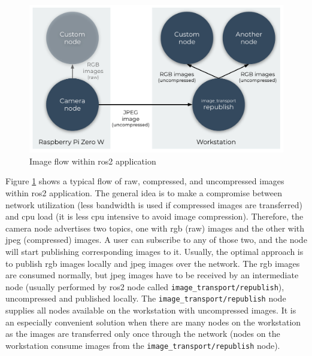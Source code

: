 \begin{figure}[H]
    \centering
    \includegraphics[width=1\textwidth]{physical/figures/camera_ros_images.pdf}
    \caption{Image flow within \ac{ros2} application}
    \label{fig:physical:camera_ros_images}
\end{figure}

Figure \ref{fig:physical:camera_ros_images} shows a typical flow of raw, compressed, and uncompressed images within \ac{ros2} application.
The general idea is to make a compromise between network utilization (less bandwidth is used if compressed images are transferred) and \ac{cpu} load (it is less \ac{cpu} intensive to avoid image compression).
Therefore, the camera node advertises two topics, one with \acs{rgb} (raw) images and the other with \acs{jpeg} (compressed) images.
A user can subscribe to any of those two, and the node will start publishing corresponding images to it.
Usually, the optimal approach is to publish \ac{rgb} images locally and \acs{jpeg} images over the network.
The \ac{rgb} images are consumed normally, but \acs{jpeg} images have to be received by an intermediate node (usually performed by \ac{ros2} node called \texttt{image\_transport/republish}), uncompressed and published locally.
The \texttt{image\_transport/republish} node supplies all nodes available on the workstation with uncompressed images.
It is an especially convenient solution when there are many nodes on the workstation as the images are transferred only once through the network (nodes on the workstation consume images from the \texttt{image\_transport/republish} node).

 
